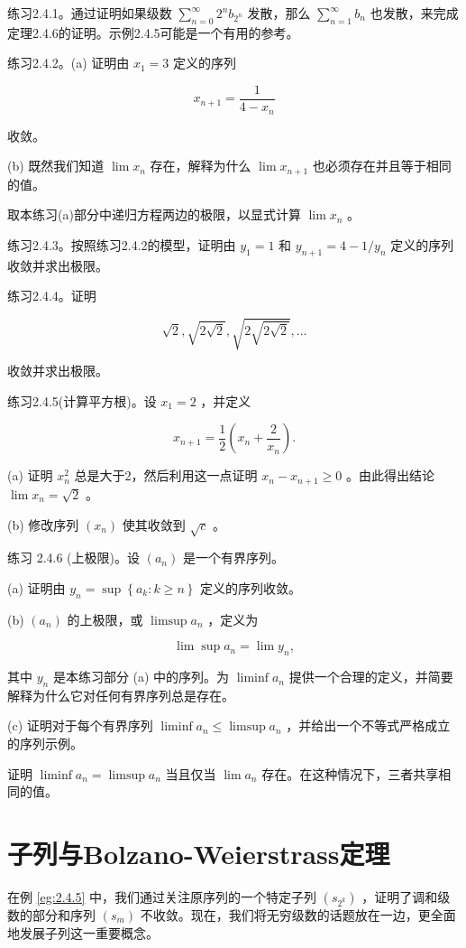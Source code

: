 练习2.4.1。通过证明如果级数 \(\mathop{\sum }\limits_{{n = 0}}^{\infty }{2}^{n}{b}_{{2}^{n}}\) 发散，那么 \(\mathop{\sum }\limits_{{n = 1}}^{\infty }{b}_{n}\) 也发散，来完成定理2.4.6的证明。示例2.4.5可能是一个有用的参考。

练习2.4.2。(a) 证明由 \({x}_{1} = 3\) 定义的序列

\[
{x}_{n + 1} = \frac{1}{4 - {x}_{n}}
\]

收敛。

(b) 既然我们知道 \(\lim {x}_{n}\) 存在，解释为什么 \(\lim {x}_{n + 1}\) 也必须存在并且等于相同的值。

取本练习(a)部分中递归方程两边的极限，以显式计算 \(\lim {x}_{n}\) 。

练习2.4.3。按照练习2.4.2的模型，证明由 \({y}_{1} = 1\) 和 \({y}_{n + 1} = 4 - 1/{y}_{n}\) 定义的序列收敛并求出极限。

练习2.4.4。证明

\[
\sqrt{2},\sqrt{2\sqrt{2}},\sqrt{2\sqrt{2\sqrt{2}}},\ldots
\]

收敛并求出极限。

练习2.4.5(计算平方根)。设 \({x}_{1} = 2\) ，并定义

\[
{x}_{n + 1} = \frac{1}{2}\left( {{x}_{n} + \frac{2}{{x}_{n}}}\right) .
\]

(a) 证明 \({x}_{n}^{2}\) 总是大于2，然后利用这一点证明 \({x}_{n} - {x}_{n + 1} \geq  0\) 。由此得出结论 \(\lim {x}_{n} = \sqrt{2}\) 。

(b) 修改序列 \(\left( {x}_{n}\right)\) 使其收敛到 \(\sqrt{c}\) 。

练习 2.4.6 (上极限)。设 \(\left( {a}_{n}\right)\) 是一个有界序列。

(a) 证明由 \({y}_{n} = \sup \left\{  {{a}_{k} : k \geq  n}\right\}\) 定义的序列收敛。

(b) \(\left( {a}_{n}\right)\) 的上极限，或 \(\limsup {a}_{n}\) ，定义为

\[
\lim \sup {a}_{n} = \lim {y}_{n},
\]

其中 \({y}_{n}\) 是本练习部分 (a) 中的序列。为 \(\liminf {a}_{n}\) 提供一个合理的定义，并简要解释为什么它对任何有界序列总是存在。

(c) 证明对于每个有界序列 \(\liminf {a}_{n} \leq  \limsup {a}_{n}\) ，并给出一个不等式严格成立的序列示例。

证明 \(\liminf {a}_{n} = \limsup {a}_{n}\) 当且仅当 \(\lim {a}_{n}\) 存在。在这种情况下，三者共享相同的值。

\section{子列与Bolzano-Weierstrass定理}
\label{sec:2.5}
在例 \ref{eg:2.4.5} 中，我们通过关注原序列的一个特定子列 \(\left( {s}_{{2}^{k}}\right)\) ，证明了调和级数的部分和序列 \(\left( {s}_{m}\right)\) 不收敛。现在，我们将无穷级数的话题放在一边，更全面地发展子列这一重要概念。


